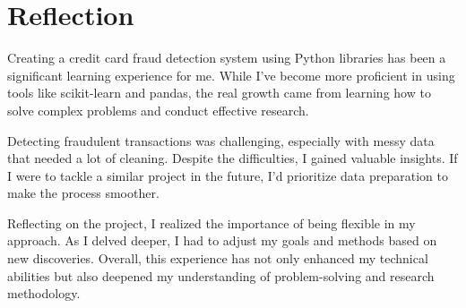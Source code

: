 \chapter{   Reflection}
\label{ch:reflection}
Creating a credit card fraud detection system using Python libraries has been a significant learning experience for me. While I've become more proficient in using tools like scikit-learn and pandas, the real growth came from learning how to solve complex problems and conduct effective research.

Detecting fraudulent transactions was challenging, especially with messy data that needed a lot of cleaning. Despite the difficulties, I gained valuable insights. If I were to tackle a similar project in the future, I'd prioritize data preparation to make the process smoother.

Reflecting on the project, I realized the importance of being flexible in my approach. As I delved deeper, I had to adjust my goals and methods based on new discoveries. Overall, this experience has not only enhanced my technical abilities but also deepened my understanding of problem-solving and research methodology.